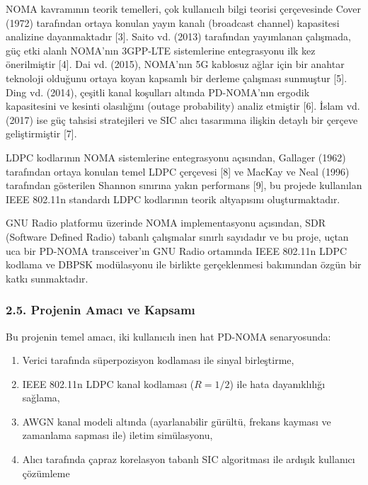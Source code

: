 \documentclass[
]{IEEEtran}
\providecommand{\tightlist}{%
  \setlength{\itemsep}{0pt}\setlength{\parskip}{0pt}}
\begin{document}
NOMA kavramının teorik temelleri, çok kullanıcılı bilgi teorisi
çerçevesinde Cover (1972) tarafından ortaya konulan yayın kanalı
(broadcast channel) kapasitesi analizine dayanmaktadır {[}3{]}. Saito
vd. (2013) tarafından yayımlanan çalışmada, güç etki alanlı NOMA'nın
3GPP-LTE sistemlerine entegrasyonu ilk kez önerilmiştir {[}4{]}. Dai vd.
(2015), NOMA'nın 5G kablosuz ağlar için bir anahtar teknoloji olduğunu
ortaya koyan kapsamlı bir derleme çalışması sunmuştur {[}5{]}. Ding vd.
(2014), çeşitli kanal koşulları altında PD-NOMA'nın ergodik kapasitesini
ve kesinti olasılığını (outage probability) analiz etmiştir {[}6{]}.
İslam vd. (2017) ise güç tahsisi stratejileri ve SIC alıcı tasarımına
ilişkin detaylı bir çerçeve geliştirmiştir {[}7{]}.

LDPC kodlarının NOMA sistemlerine entegrasyonu açısından, Gallager
(1962) tarafından ortaya konulan temel LDPC çerçevesi {[}8{]} ve MacKay
ve Neal (1996) tarafından gösterilen Shannon sınırına yakın performans
{[}9{]}, bu projede kullanılan IEEE 802.11n standardı LDPC kodlarının
teorik altyapısını oluşturmaktadır.

GNU Radio platformu üzerinde NOMA implementasyonu açısından, SDR
(Software Defined Radio) tabanlı çalışmalar sınırlı sayıdadır ve bu
proje, uçtan uca bir PD-NOMA transceiver'ın GNU Radio ortamında IEEE
802.11n LDPC kodlama ve DBPSK modülasyonu ile birlikte gerçeklenmesi
bakımından özgün bir katkı sunmaktadır.

\subsubsection{2.5. Projenin Amacı ve
Kapsamı}\label{projenin-amacux131-ve-kapsamux131}

Bu projenin temel amacı, iki kullanıcılı inen hat PD-NOMA senaryosunda:

\begin{enumerate}
\def\labelenumi{\arabic{enumi}.}
\tightlist
\item
  Verici tarafında süperpozisyon kodlaması ile sinyal birleştirme,
\item
  IEEE 802.11n LDPC kanal kodlaması (\(R = 1/2\)) ile hata dayanıklılığı
  sağlama,
\item
  AWGN kanal modeli altında (ayarlanabilir gürültü, frekans kayması ve
  zamanlama sapması ile) iletim simülasyonu,
\item
  Alıcı tarafında çapraz korelasyon tabanlı SIC algoritması ile ardışık
  kullanıcı çözümleme
\end{enumerate}
\end{document}
